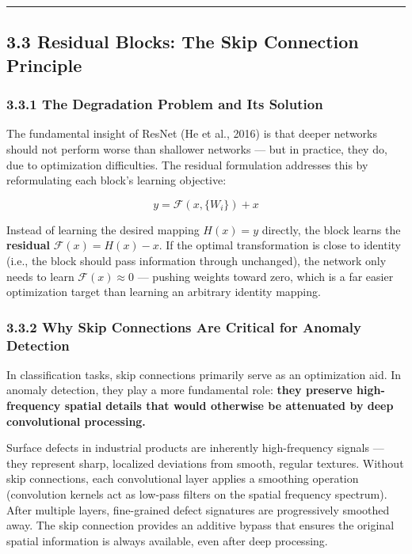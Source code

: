 \begin{center}\rule{0.5\linewidth}{0.5pt}\end{center}

\subsection{3.3 Residual Blocks: The Skip Connection Principle}\label{residual-blocks-the-skip-connection-principle}

\subsubsection{3.3.1 The Degradation Problem and Its Solution}\label{the-degradation-problem-and-its-solution}

The fundamental insight of ResNet (He et al., 2016) is that deeper networks should not perform worse than shallower networks --- but in practice, they do, due to optimization difficulties. The residual formulation addresses this by reformulating each block's learning objective:

\[y = \mathcal{F}(x, \{W_i\}) + x\]

Instead of learning the desired mapping \(H(x) = y\) directly, the block learns the \textbf{residual} \(\mathcal{F}(x) = H(x) - x\). If the optimal transformation is close to identity (i.e., the block should pass information through unchanged), the network only needs to learn \(\mathcal{F}(x) \approx 0\) --- pushing weights toward zero, which is a far easier optimization target than learning an arbitrary identity mapping.

\subsubsection{3.3.2 Why Skip Connections Are Critical for Anomaly Detection}\label{why-skip-connections-are-critical-for-anomaly-detection}

In classification tasks, skip connections primarily serve as an optimization aid. In anomaly detection, they play a more fundamental role: \textbf{they preserve high-frequency spatial details that would otherwise be attenuated by deep convolutional processing.}

Surface defects in industrial products are inherently high-frequency signals --- they represent sharp, localized deviations from smooth, regular textures. Without skip connections, each convolutional layer applies a smoothing operation (convolution kernels act as low-pass filters on the spatial frequency spectrum). After multiple layers, fine-grained defect signatures are progressively smoothed away. The skip connection provides an additive bypass that ensures the original spatial information is always available, even after deep processing.


